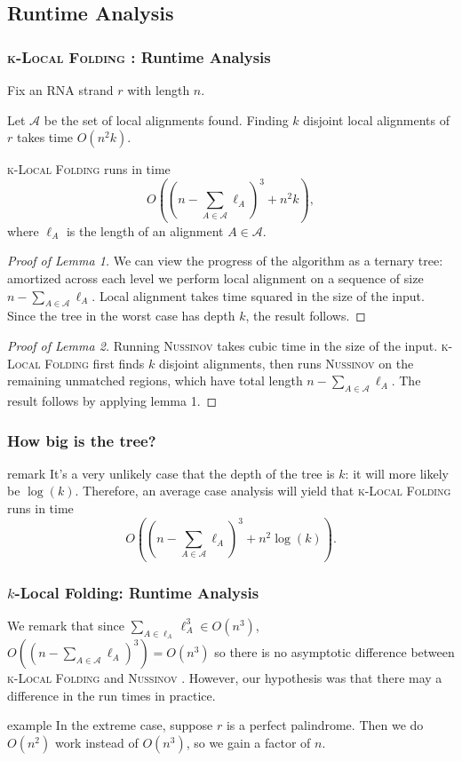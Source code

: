 \documentclass{beamer}
\newcommand{\klf}{\textsc{k-Local Folding} }
\newcommand{\rf}{\textsc{Nussinov} }
\newcommand{\al}{\mathscr{A}}
\begin{document}
\begin{frame}
\subsection{Runtime Analysis}
\frametitle{\klf: Runtime Analysis}
Fix an RNA strand $r$ with length $n$. 
\begin{lemma}[1]
Let $\al$ be the set of local alignments found. Finding $k$ disjoint local alignments of $r$ takes time $O(n^2 k)$. 
\end{lemma}
\begin{lemma}[2]
\klf runs in time
\[O\left(\left(n-\sum_{A\in\al}\ell_A\right)^3+n^2k\right),\] where $\ell_A$ is the length of an alignment $A\in\al$. 
\end{lemma}
\end{frame}

\begin{frame}
\begin{proof}[Proof of Lemma 1]
We can view the progress of the algorithm as a ternary tree: amortized across each level we perform local alignment on a sequence of size $n-\sum_{A\in\al}\ell_A$. Local alignment takes time squared in the size of the input. Since the tree in the worst case has depth $k$, the result follows. 
\end{proof}
\begin{proof}[Proof of Lemma 2]
Running \rf takes cubic time in the size of the input. \klf first finds $k$ disjoint alignments, then runs \rf on the remaining unmatched regions, which have total length $n-\sum_{A\in\al}\ell_A$.   The result follows by applying lemma 1. 
\end{proof}
\end{frame}

\begin{frame}
\frametitle{How big is the tree?}
\begin{block}{remark}
It's a very unlikely case that the depth of the tree is $k$: it will more likely be $\log(k)$. Therefore, an average case analysis will yield that \klf runs in time 
\[O\left(\left(n-\sum_{A\in\al}\ell_A\right)^3+n^2\log (k)\right).\]
\end{block}
\end{frame}

\begin{frame}
\frametitle{$k$-Local Folding: Runtime Analysis}
We remark that since $\sum_{A\in\ell_A}\ell_A^3\in O(n^3)$, $O((n-\sum_{A\in\al}\ell_A)^3)=O(n^3)$ so there is no asymptotic difference between \klf and \rf.
However, our hypothesis was that there may a difference in the run times in practice.  

\begin{block}{example}
In the extreme case, suppose $r$ is a perfect palindrome. Then we do $O(n^2)$ work instead of $O(n^3)$, so we gain a factor of $n$. 
\end{block}
\end{frame}
\end{document}
